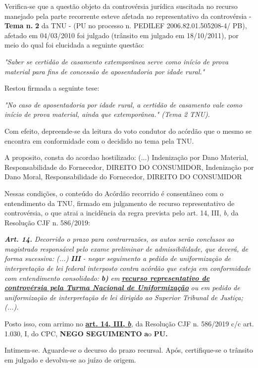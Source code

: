 \documentclass[12pt]{article}
\begin{document}
\justifying
\noindent Verifica-se que a questão objeto da controvérsia jurídica suscitada no recurso manejado pela parte recorrente esteve afetada no representativo da controvérsia - \textbf{Tema n. }\textbf{2} da TNU - (PU no processo n. PEDILEF 2006.82.01.505208-4/ PB),  afetado em 04/03/2010 foi julgado (trânsito em julgado em 18/10/2011), por meio do qual foi elucidada a seguinte questão:

\noindent \textit{"Saber se certidão de casamento extemporânea serve como início de prova material para fins de concessão de aposentadoria por idade rural."}

\noindent Restou firmada a seguinte tese:

\noindent \textit{"No caso de aposentadoria por idade rural, a certidão de casamento vale como início de prova material, ainda que extemporânea." (Tema 2 TNU).}

\noindent Com efeito, depreende-se da leitura do voto condutor do acórdão que o mesmo se encontra em conformidade com o decidido no  tema pela TNU.

\noindent A proposito, consta do acordao hostilizado: (...) Indenização por Dano Material, Responsabilidade do Fornecedor, DIREITO DO CONSUMIDOR, Indenização por Dano Moral, Responsabilidade do Fornecedor, DIREITO DO CONSUMIDOR

\noindent Nessas condições, o conteúdo do Acórdão recorrido é consentâneo com o entendimento da TNU, firmado em julgamento de recurso representativo de controvérsia, o que atrai a incidência da regra prevista pelo art. 14, III, \textit{b,} da Resolução CJF n. 586/2019:

\noindent \textit{\textbf{Art. 14.}}\textit{ Decorrido o prazo para contrarrazões, os autos serão conclusos ao magistrado responsável pelo exame preliminar de admissibilidade, que deverá, de forma sucessiva: (...) }\textit{\textbf{III }}\textit{- negar seguimento a pedido de uniformização de interpretação de lei federal interposto contra acórdão que esteja em conformidade com entendimento consolidado: }\textit{\textbf{b)}}\textit{ em }\uline{\textit{\textbf{recurso representativo de controvérsia pela Turma Nacional de Uniformização}}}\textit{ ou em pedido de uniformização de interpretação de lei dirigido ao Superior Tribunal de Justiça;(...).}

\noindent Posto isso, com arrimo no \uline{\textbf{art. 14, III, }}\uline{\textit{\textbf{b}}}\textit{,} da Resolução CJF n. 586/2019 c/c art. 1.030, I, do CPC, \textbf{NEGO SEGUIMENTO }\textbf{a}o\textbf{ PU}\textbf{.}

\noindent Intimem-se. Aguarde-se o decurso do prazo recursal. Após, certifique-se o trânsito em julgado e devolva-se ao juízo de origem.
\end{document}

